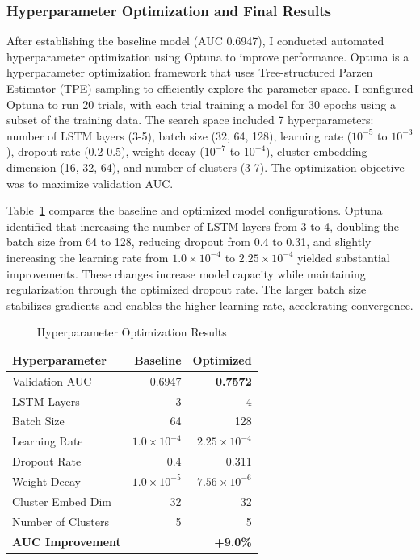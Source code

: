 \documentclass[letterpaper]{article} %
\begin{document}
\subsubsection{Hyperparameter Optimization and Final Results}

After establishing the baseline model (AUC 0.6947), I conducted automated hyperparameter optimization using Optuna to improve performance. Optuna is a hyperparameter optimization framework that uses Tree-structured Parzen Estimator (TPE) sampling to efficiently explore the parameter space. I configured Optuna to run 20 trials, with each trial training a model for 30 epochs using a subset of the training data. The search space included 7 hyperparameters: number of LSTM layers (3-5), batch size (32, 64, 128), learning rate ($10^{-5}$ to $10^{-3}$), dropout rate (0.2-0.5), weight decay ($10^{-7}$ to $10^{-4}$), cluster embedding dimension (16, 32, 64), and number of clusters (3-7). The optimization objective was to maximize validation AUC.

Table~\ref{tab:optimization_results} compares the baseline and optimized model configurations. Optuna identified that increasing the number of LSTM layers from 3 to 4, doubling the batch size from 64 to 128, reducing dropout from 0.4 to 0.31, and slightly increasing the learning rate from $1.0 \times 10^{-4}$ to $2.25 \times 10^{-4}$ yielded substantial improvements. These changes increase model capacity while maintaining regularization through the optimized dropout rate. The larger batch size stabilizes gradients and enables the higher learning rate, accelerating convergence.

\begin{table}[h]
    \centering
    \caption{Hyperparameter Optimization Results}
    \label{tab:optimization_results}
    \begin{tabular}{@{}lrr@{}}
        \toprule
        \textbf{Hyperparameter} & \textbf{Baseline} & \textbf{Optimized} \\
        \midrule
            Validation AUC & 0.6947 & \textbf{0.7572} \\
            LSTM Layers & 3 & 4 \\
            Batch Size & 64 & 128 \\
            Learning Rate & $1.0 \times 10^{-4}$ & $2.25 \times 10^{-4}$ \\
            Dropout Rate & 0.4 & 0.311 \\
            Weight Decay & $1.0 \times 10^{-5}$ & $7.56 \times 10^{-6}$ \\
            Cluster Embed Dim & 32 & 32 \\
            Number of Clusters & 5 & 5 \\
        \midrule
        \textbf{AUC Improvement} & & \textbf{+9.0\%} \\
        \bottomrule
    \end{tabular}
\end{table}
\end{document}
